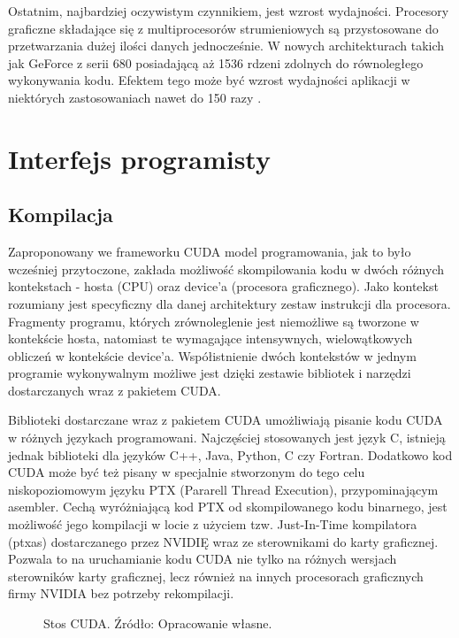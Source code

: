 Ostatnim, najbardziej oczywistym czynnikiem, jest wzrost wydajności. Procesory
graficzne składające się z multiprocesorów strumieniowych są przystosowane do
przetwarzania dużej ilości danych jednocześnie. W nowych architekturach takich
jak GeForce z serii 680 posiadającą aż 1536 rdzeni zdolnych do równoległego
wykonywania kodu. Efektem tego może być wzrost wydajności aplikacji w niektórych
zastosowaniach nawet do 150 razy \cite{prez}.

\section{Interfejs programisty}

\subsection{Kompilacja}

Zaproponowany we frameworku CUDA model programowania, jak to było wcześniej
przytoczone, zakłada możliwość
skompilowania kodu w dwóch różnych kontekstach - hosta (CPU) oraz device'a
(procesora graficznego). Jako kontekst rozumiany jest specyficzny dla danej architektury zestaw
instrukcji dla procesora. Fragmenty programu, których zrównoleglenie jest
niemożliwe są tworzone w kontekście hosta, natomiast te wymagające intensywnych,
wielowątkowych obliczeń w kontekście device'a. Współistnienie dwóch
kontekstów w jednym programie wykonywalnym możliwe jest dzięki zestawie
bibliotek i narzędzi dostarczanych wraz z pakietem CUDA.

Biblioteki dostarczane wraz z pakietem CUDA umożliwiają pisanie kodu CUDA w różnych
językach programowani. Najczęściej stosowanych jest język C, istnieją jednak biblioteki
dla języków C++, Java, Python, C czy Fortran. Dodatkowo kod CUDA może być też pisany w specjalnie stworzonym do tego celu
niskopoziomowym języku PTX (Pararell Thread Execution), przypominającym asembler.
Cechą wyróżniającą kod PTX od skompilowanego kodu binarnego, jest możliwość jego
kompilacji w locie z użyciem tzw. Just-In-Time kompilatora (ptxas) dostarczanego przez
NVIDIĘ wraz ze sterownikami do karty graficznej. Pozwala to na uruchamianie kodu
CUDA nie tylko na różnych wersjach sterowników karty graficznej, lecz również na
innych procesorach graficznych firmy NVIDIA bez potrzeby rekompilacji.

\begin{figure}[ht]
\centering

\caption{Stos CUDA. Źródło: Opracowanie własne.}
\label{cuda-model}
\end{figure}

